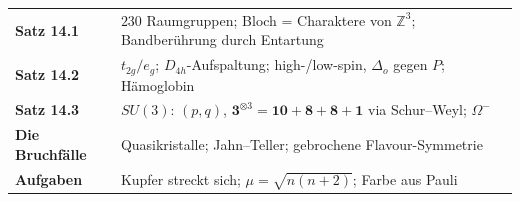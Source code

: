 \begin{merksatz}
\begin{center}
\renewcommand{\arraystretch}{1.5}
\begin{tabular}{@{}P{3.0cm}P{5.6cm}@{}}
\toprule
\textbf{Satz 14.1} & $230$ Raumgruppen; Bloch = Charaktere von $\mathbb Z^{3}$; Bandberührung durch Entartung\\
\textbf{Satz 14.2} & $t_{2g}/e_g$; $D_{4h}$-Aufspaltung; high-/low-spin, $\Delta_o$ gegen $P$; Hämoglobin\\
\textbf{Satz 14.3} & $SU(3)$: $(p, q)$, $\mathbf 3^{\otimes3} = \mathbf{10} + \mathbf 8 + \mathbf 8 + \mathbf 1$ via Schur--Weyl; $\Omega^{-}$\\
\textbf{Die Bruchfälle} & Quasikristalle; Jahn--Teller; gebrochene Flavour-Symmetrie\\
\textbf{Aufgaben} & Kupfer streckt sich; $\mu = \sqrt{n(n+2)}$; Farbe aus Pauli\\
\bottomrule
\end{tabular}
\end{center}

\begin{center}
\begin{minipage}{0.88\textwidth}
\end{minipage}
\end{center}
\end{merksatz}
